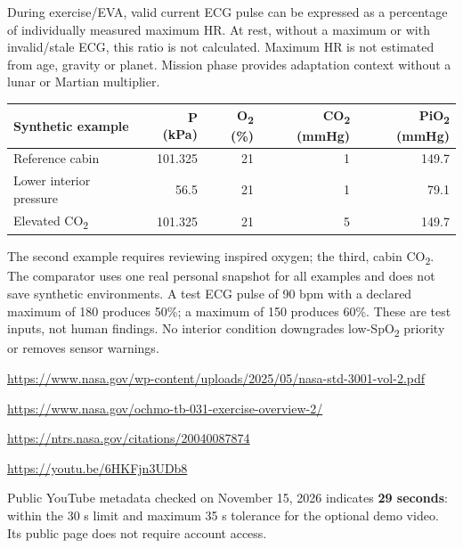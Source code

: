 During exercise/EVA, valid current ECG pulse can be expressed as a percentage of individually measured maximum HR. At rest, without a maximum or with invalid/stale ECG, this ratio is not calculated. Maximum HR is not estimated from age, gravity or planet. Mission phase provides adaptation context without a lunar or Martian multiplier.
\begin{tabularx}{\linewidth}{@{}Xrrrr@{}}\toprule
Synthetic example & P (kPa) & O\textsubscript{2} (\%) & CO\textsubscript{2} (mmHg) & PiO\textsubscript{2} (mmHg)\\\midrule
Reference cabin &101.325&21&1&149.7\\
Lower interior pressure &56.5&21&1&79.1\\
Elevated CO\textsubscript{2} &101.325&21&5&149.7\\\bottomrule\end{tabularx}
The second example requires reviewing inspired oxygen; the third, cabin CO\textsubscript{2}. The comparator uses one real personal snapshot for all examples and does not save synthetic environments. A test ECG pulse of 90 bpm with a declared maximum of 180 produces 50\%; a maximum of 150 produces 60\%. These are test inputs, not human findings. No interior condition downgrades low-SpO\textsubscript{2} priority or removes sensor warnings.
{\footnotesize\url{https://www.nasa.gov/wp-content/uploads/2025/05/nasa-std-3001-vol-2.pdf}\par
\url{https://www.nasa.gov/ochmo-tb-031-exercise-overview-2/}\par
\url{https://ntrs.nasa.gov/citations/20040087874}}
\url{https://youtu.be/6HKFjn3UDb8}\par
Public YouTube metadata checked on November 15, 2026 indicates \textbf{29 seconds}: within the 30 s limit and maximum 35 s tolerance for the optional demo video. Its public page does not require account access.
